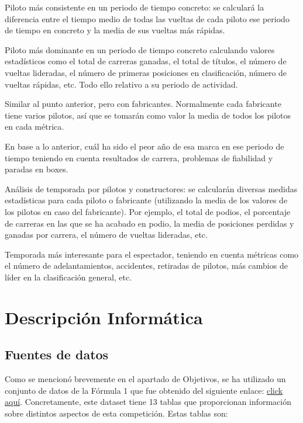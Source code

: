\documentclass[12pt,twoside,titlepage]{report}
\begin{document}
\begin{compactitem}
  \item Piloto más consistente en un periodo de tiempo concreto: se calculará la diferencia entre el tiempo medio de todas las vueltas de cada piloto ese periodo de tiempo en concreto y la media de sus vueltas más rápidas.
  \item Piloto más dominante en un periodo de tiempo concreto calculando valores estadísticos como el total de carreras ganadas, el total de títulos, el número de vueltas lideradas, el número de primeras posiciones en clasificación, número de vueltas rápidas, etc. Todo ello relativo a su periodo de actividad.
  \item Similar al punto anterior, pero con fabricantes. Normalmente cada fabricante tiene varios pilotos, así que se tomarán como valor la media de todos los pilotos en cada métrica.
  \item En base a lo anterior, cuál ha sido el peor año de esa marca en ese periodo de tiempo teniendo en cuenta resultados de carrera, problemas de fiabilidad y paradas en boxes.
  \item Análisis de temporada por pilotos y constructores: se calcularán diversas medidas estadísticas para cada piloto o fabricante (utilizando la media de los valores de los pilotos en caso del fabricante). Por ejemplo, el total de podios, el porcentaje de carreras en las que se ha acabado en podio, la media de posiciones perdidas y ganadas por carrera, el número de vueltas lideradas, etc.
  \item Temporada más interesante para el espectador, teniendo en cuenta métricas como el número de adelantamientos, accidentes, retiradas de pilotos, más cambios de líder en la clasificación general, etc.
\end{compactitem}




\chapter{Descripción Informática}
\label{chap:contenidos}
\newpage

\section{Fuentes de datos}

Como se mencionó brevemente en el apartado de Objetivos, se ha utilizado un conjunto de datos de la Fórmula 1 que fue obtenido del siguiente enlace: \href{https://www.kaggle.com/rohanrao/formula-1-world-championship-1950-2020}{click aquí}. Concretamente, este dataset tiene 13 tablas que proporcionan información sobre distintos aspectos de esta competición. Estas tablas son:
\end{document}
